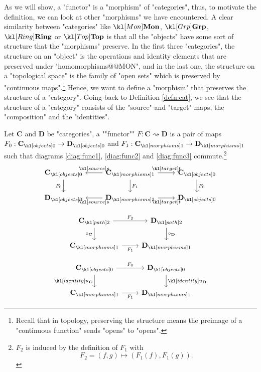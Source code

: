 \documentclass[main.tex]{subfiles}
\begin{document}
As we will show, a "functor" is a "morphism" of "categories", thus, to motivate the definition, we can look at other "morphisms" we have encountered. A clear similarity between "categories" like $\catMon$, $\catGrp$, $\catRing$ or $\catTop$ is that all the "objects" have some sort of structure that the "morphisms" preserve. In the first three "categories", the structure on an "object" is the operations and identity elements that are preserved under "homomorphisms@@MON", and in the last one, the structure on a "topological space" is the family of "open sets" which is preserved by "continuous maps".\footnote{Recall that in topology, preserving the structure means the preimage of a "continuous function" sends "opens" to "opens".}  Hence, we want to define a "morphism" that preserves the structure of a "category". Going back to Definition \ref{defn:cat}, we see that the structure of a "category" consists of the "source" and "target" maps, the "composition" and the "identities".
\begin{defn}[Functor]\label{defn:func}
	\AP Let $\mathbf{C}$ and $\mathbf{D}$ be "categories", a ""functor"" $F: \mathbf{C} \rightsquigarrow \mathbf{D}$ is a pair of maps $F_0:\obj{\mathbf{C}} \rightarrow \obj{\mathbf{D}}$ and $F_1:\mor{\mathbf{C}} \rightarrow \mor{\mathbf{D}}$ such that diagrams \eqref{diag:func1}, \eqref{diag:func2} and \eqref{diag:func3} commute.\footnote{$F_2$ is induced by the definition of $F_1$ with \[F_2 = (f,g) \mapsto (F_1(f), F_1(g)).\]}
	\begin{equation}\label{diag:func1}
		\begin{tikzcd}
			\obj{\mathbf{C}} \arrow[d, "F_0"'] & \mor{\mathbf{C}} \arrow[d, "F_1"] \arrow[l, "\source"'] \arrow[r, "\target"] & \obj{\mathbf{C}} \arrow[d, "F_0"] \\
			\obj{\mathbf{D}} & \mor{\mathbf{D}} \arrow[l, "\source"] \arrow[r, "\target"'] & \obj{\mathbf{D}}
		\end{tikzcd}
	\end{equation}
	\begin{minipage}{0.49\textwidth}
		\begin{equation}\label{diag:func2}
		\begin{tikzcd}
			\mortwo{\mathbf{C}} \arrow[d, "\circ_\mathbf{C}"'] \arrow[r, "F_2"] & \mortwo{\mathbf{D}} \arrow[d, "\circ_\mathbf{D}"] \\
			\mor{\mathbf{C}} \arrow[r, "F_1"'] & \mor{\mathbf{D}}
		\end{tikzcd}
		\end{equation}
	\end{minipage}
	\begin{minipage}{0.49\textwidth}
			\begin{equation}\label{diag:func3}
		\begin{tikzcd}
			\obj{\mathbf{C}} \arrow[d, "\idu_{\mathbf{C}}"'] \arrow[r, "F_0"] & \obj{\mathbf{D}} \arrow[d, "\idu_{\mathbf{D}}"] \\
			\mor{\mathbf{C}} \arrow[r, "F_1"'] & \mor{\mathbf{D}}
		\end{tikzcd}
		\end{equation}
	\end{minipage}
\end{defn}
\end{document}
